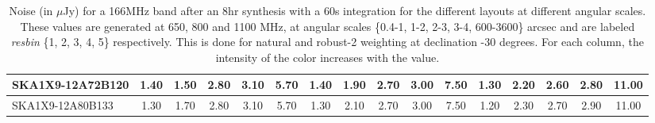 \begin{table}[htp]
{{\begin{tabular}{|lccccc||ccccc||ccccc|}
SKA1X9-12A72B120 & 1.40 \cellcolor{blue!28.50} & 1.50 \cellcolor{red!30.00} & 2.80 \cellcolor{green!60.00} & 3.10 \cellcolor{orange!60.00} & 5.70 \cellcolor{purple!49.50} & 1.40 \cellcolor{blue!32.00} & 1.90 \cellcolor{red!49.50} & 2.70 \cellcolor{green!60.00} & 3.00 \cellcolor{orange!60.00} & 7.50 \cellcolor{purple!60.00} & 1.30 \cellcolor{blue!26.40} & 2.20 \cellcolor{red!49.50} & 2.60 \cellcolor{green!49.50} & 2.80 \cellcolor{orange!49.50} & 11.00 \cellcolor{purple!60.00}\\ \hline 
SKA1X9-12A80B133 & 1.30 \cellcolor{blue!18.00} & 1.70 \cellcolor{red!42.00} & 2.80 \cellcolor{green!60.00} & 3.10 \cellcolor{orange!60.00} & 5.70 \cellcolor{purple!49.50} & 1.30 \cellcolor{blue!18.00} & 2.10 \cellcolor{red!60.00} & 2.70 \cellcolor{green!60.00} & 3.00 \cellcolor{orange!60.00} & 7.50 \cellcolor{purple!60.00} & 1.20 \cellcolor{blue!18.00} & 2.30 \cellcolor{red!60.00} & 2.70 \cellcolor{green!60.00} & 2.90 \cellcolor{orange!60.00} & 11.00 \cellcolor{purple!60.00}\\ \hline 
\end{tabular}}
\vspace{-0.300000cm}
\hspace{1cm} 

\vspace{.25cm}
\caption{Noise (in $\mu$Jy) for a 166MHz band after an 8hr synthesis with a 60s integration for the different layouts at different angular scales. These values are generated at 650, 800 and 1100 MHz, at angular scales \{0.4-1, 1-2, 2-3, 3-4, 600-3600\} arcsec and are labeled {\it resbin} \{1, 2, 3, 4, 5\} respectively. This is done for natural and robust-2 weighting at declination -30 degrees. For each column, the intensity of the color increases with the value.}\label{tab:noise166}}
 \end{table}
